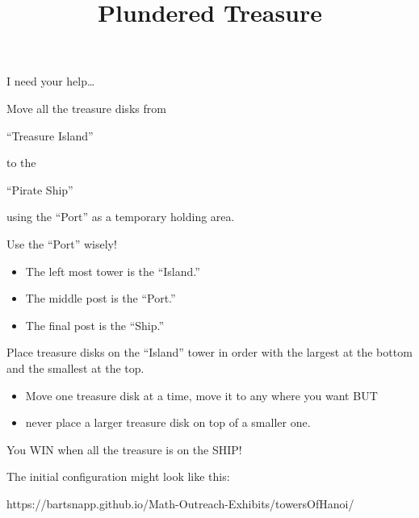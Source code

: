 \documentclass{../exhibit}
\title{Plundered Treasure}
\begin{document}
\begin{context} I need your help\dots


Move all the treasure disks from


\quad ``Treasure Island''

\quad \quad \quad\quad to the


\quad \quad \quad \quad \quad ``Pirate Ship''




using the ``Port'' as a
temporary holding area.


Use the ``Port'' wisely!
\end{context}

\begin{directions}
\begin{itemize}
\item The left most tower is the ``Island.''
\item The middle post is the ``Port.''
\item The final post is the ``Ship.''
\end{itemize}

Place treasure disks on the ``Island'' tower in order with the largest
at the bottom and the smallest at the top.
\begin{itemize}
\item Move one treasure disk at a time, move it to any where you want
  BUT
\item never place a larger treasure disk on top of a smaller one.
\end{itemize}
You WIN when all the treasure is on the SHIP!
\end{directions}


\begin{example}
  The initial configuration might look like this:
\begin{center}
\end{center}
\end{example}


\begin{mathConnections}
  https://bartsnapp.github.io/Math-Outreach-Exhibits/towersOfHanoi/
\end{mathConnections}
\end{document}
